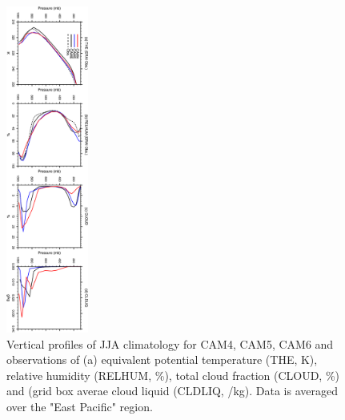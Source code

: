 \clearpage
\begin{figure}[t]
  \begin{center}
    \includegraphics[width=0.24\textwidth,angle=90.]{./figs/f_VPROF_EPAC_JJA.pdf}
  \end{center}
  \caption{Vertical profiles of JJA climatology for CAM4, CAM5, CAM6 and observations of (a) equivalent potential temperature (THE, K), relative humidity (RELHUM, \%), total cloud fraction (CLOUD, \%) and (grid box averae cloud liquid (CLDLIQ, \g/kg). Data is averaged over the "East Pacific" region.} 
\label{f_VPROF_NITCZ._JJA}
\end{figure} 

